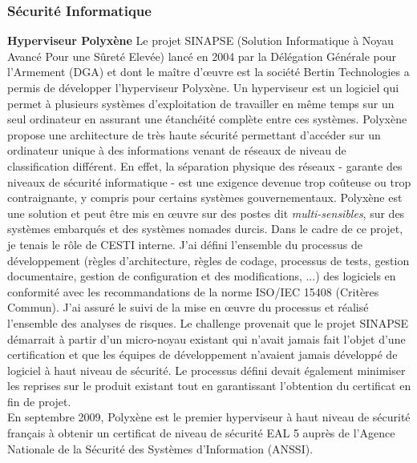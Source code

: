 \documentclass[a4paper,12pt]{article}
\begin{document}
\subsubsection{S\'ecurit\'e Informatique}
\textbf{Hyperviseur Polyx\`ene}
Le projet SINAPSE (Solution Informatique \`a Noyau Avanc\'e Pour une
S\^uret\'e Elev\'ee) lanc\'e en 2004 par la D\'el\'egation
G\'en\'erale pour l'Armement (DGA) et dont le ma\^itre d'\oe{}uvre est
la soci\'et\'e Bertin Technologies a permis de d\'evelopper
l'hyperviseur Polyx\`ene.
Un hyperviseur est un logiciel qui permet \`a plusieurs syst\`emes
d'exploitation de travailler en m\^eme temps sur un seul ordinateur en
assurant une \'etanch\'eit\'e compl\`ete entre ces syst\`emes.
Polyx\`ene propose une architecture de tr\`es haute s\'ecurit\'e
permettant d'acc\'eder sur un ordinateur unique \`a des informations
venant de r\'eseaux de niveau de classification diff\'erent. En effet,
la s\'eparation physique des r\'eseaux - garante des niveaux de
s\'ecurit\'e informatique - est une exigence devenue trop co\^uteuse
ou trop contraignante, y compris pour certains syst\`emes
gouvernementaux. Polyx\`ene est une solution et peut \^etre mis en
\oe{}uvre sur des postes dit \emph{multi-sensibles}, sur des
syst\`emes embarqu\'es et des syst\`emes nomades durcis.  Dans le
cadre de ce projet, je tenais le r\^ole de CESTI interne. J'ai
d\'efini l'ensemble du processus de d\'eveloppement (r\`egles
d'architecture, r\`egles de codage, processus de tests, gestion
documentaire, gestion de configuration et des modifications, ...)  des
logiciels en conformit\'e avec les recommandations de la norme ISO/IEC
15408 (Crit\`eres Commun). J'ai assur\'e le suivi de la mise en
\oe{}uvre du processus et r\'ealis\'e l'ensemble des analyses de
risques.  Le challenge provenait que le projet SINAPSE d\'emarrait \`a
partir d'un micro-noyau existant qui n'avait jamais fait l'objet d'une
certification et que les \'equipes de d\'eveloppement n'avaient jamais
d\'evelopp\'e de logiciel \`a haut niveau de s\'ecurit\'e. Le
processus d\'efini devait \'egalement minimiser les reprises sur le
produit existant tout en garantissant l'obtention du certificat en fin
de projet.
\\
En septembre 2009, Polyx\`ene est le premier hyperviseur \`a haut
niveau de s\'ecurit\'e fran\c{c}ais \`a obtenir un certificat de
niveau de s\'ecurit\'e EAL 5 aupr\`es de l'Agence Nationale de la
S\'ecurit\'e des Syst\`emes d'Information (ANSSI).
\end{document}
